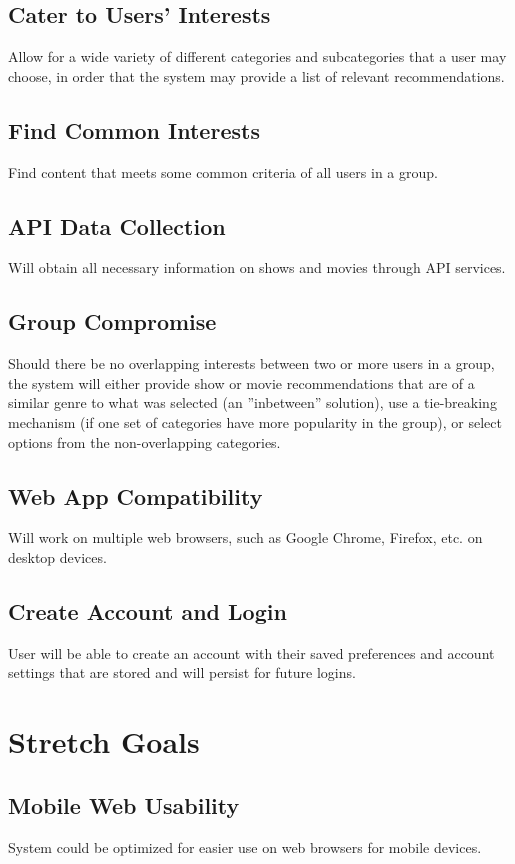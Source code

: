\documentclass{article}
\begin{document}
\subsection{Cater to Users' Interests}
Allow for a wide variety of different categories and subcategories that a user may choose, in order that the system may provide a list of relevant recommendations.

\subsection{Find Common Interests}
Find content that meets some common criteria of all users in a group.

\subsection{API Data Collection}
Will obtain all necessary information on shows and movies through API services.

\subsection{Group Compromise}
Should there be no overlapping interests between two or more users in a group, the system will either provide show or movie recommendations that are of a similar 
genre to what was selected (an ”inbetween” solution), use a tie-breaking mechanism (if one set of categories have more popularity in the group), or select options 
from the non-overlapping categories.

\subsection{Web App Compatibility}
Will work on multiple web browsers, such as Google Chrome, Firefox, etc. on desktop devices.

\subsection{Create Account and Login}
User will be able to create an account with their saved preferences and account settings that are stored and will persist for future logins.

\section{Stretch Goals}

\subsection{Mobile Web Usability}
System could be optimized for easier use on web browsers for mobile devices.
\end{document}
